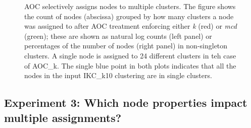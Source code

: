 \documentclass[12pt, oneside]{article}   	%
\begin{document}
\begin{figure}[H]
\begin{subfigure}[t]{0.48\textwidth}
    	\end{subfigure}
\captionsetup{width=0.9\textwidth}	
\caption{AOC selectively assigns nodes to multiple clusters. The figure shows the count of nodes (abscissa) grouped by how many clusters a node was assigned to after AOC treatment enforcing either \emph{k} (red) or \emph{mcd} (green);  these are shown as natural log counts (left panel) or percentages of the number of nodes (right panel) in non-singleton clusters. A single node is assigned to 24 different clusters in teh case of AOC\_k. The single blue point in both plots indicates that all the nodes in the input IKC\_k10 clustering are in single clusters.}
\label{fig:fig2}
\end{figure}

\subsection{Experiment 3: Which node properties impact multiple assignments?}
\end{document}
